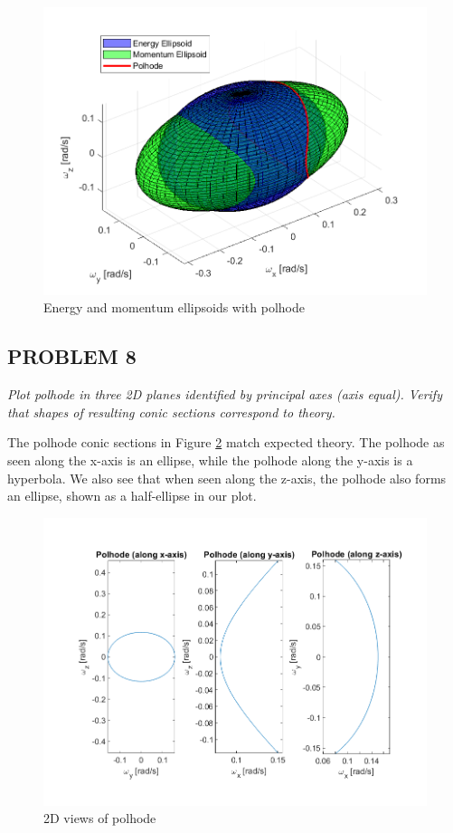 \begin{figure}[H]
\centering
\includegraphics[scale=0.65]{Images/ps2_problem7.png}
\caption{Energy and momentum ellipsoids with polhode}
\label{fig:ps2_problem7}
\end{figure}

\subsection{PROBLEM 8}
\textit{Plot polhode in three 2D planes identified by principal axes (axis equal). Verify that shapes of resulting conic sections correspond to theory.}

The polhode conic sections in Figure \ref{fig:ps2_problem8} match expected theory. The polhode as seen along the x-axis is an ellipse, while the polhode along the y-axis is a hyperbola. We also see that when seen along the z-axis, the polhode also forms an ellipse, shown as a half-ellipse in our plot.

\begin{figure}[H]
\centering
\includegraphics[scale=0.6]{Images/ps2_problem8.png}
\caption{2D views of polhode}
\label{fig:ps2_problem8}
\end{figure}


